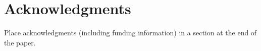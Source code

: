 \documentclass[10pt,letterpaper]{article}
\begin{document}
\section{Acknowledgments}

Place acknowledgments (including funding information) in a section at the end of the paper.





\setlength{\bibleftmargin}{.125in}
\setlength{\bibindent}{-\bibleftmargin}


\end{document}
